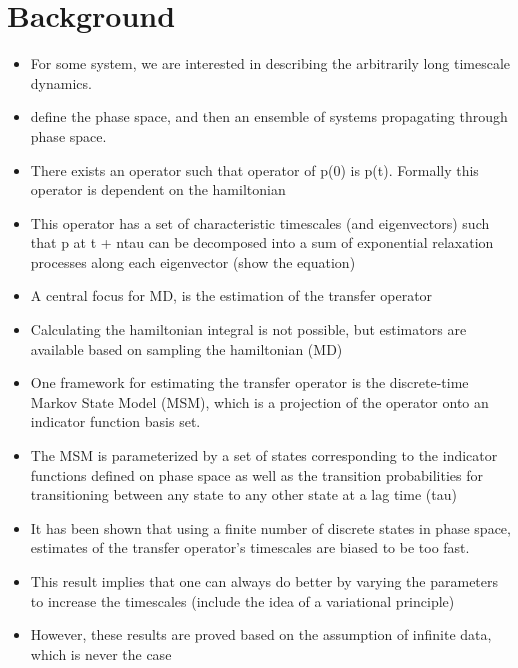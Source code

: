 \documentclass[journal=jpcbfk, layout=traditional, manuscript=article]{achemso}
\begin{document}
\section{Background}
\begin{itemize}
\item For some system, we are interested in describing the arbitrarily long timescale dynamics. 
\item define the phase space, and then an ensemble of systems propagating through phase space. 
\item There exists an operator such that operator of p(0) is p(t). Formally this operator is dependent on the hamiltonian
\item This operator has a set of characteristic timescales (and eigenvectors) such that p at t + ntau can be decomposed into a sum of exponential relaxation processes along each eigenvector (show the equation)
\item A central focus for MD, is the estimation of the transfer operator 
\item Calculating the hamiltonian integral is not possible, but estimators are available based on sampling the hamiltonian (MD) 
\item One framework for estimating the transfer operator is the discrete-time Markov State Model (MSM), which is a projection of the operator onto an indicator function basis set. 
\item The MSM is parameterized by a set of states corresponding to the indicator functions defined on phase space as well as the transition probabilities for transitioning between any state to any other state at a lag time (tau)
\item It has been shown that using a finite number of discrete states in phase space, estimates of the transfer operator's timescales are biased to be too fast. 
\item This result implies that one can always do better by varying the parameters  to increase the timescales (include the idea of a variational principle)
\item However, these results are proved based on the assumption of infinite data, which is never the case
\end{itemize}
\end{document}
